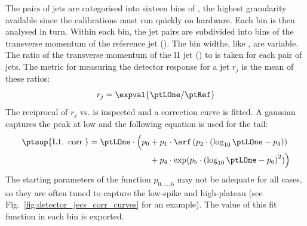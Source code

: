 The pairs of \glspl{jet} are categorised into sixteen bins of \abseta, the highest granularity available since the calibrations must run quickly on hardware. Each bin is then analysed in turn. Within each \abseta bin, the \gls{jet} pairs are subdivided into bins of the transverse momentum of the reference \gls{jet} (\ptRef). The bin widths, like \abseta, are variable. The ratio of the transverse momentum of the \acrshort{l1} \gls{jet} (\ptLOne) to \ptRef is taken for each pair of \glspl{jet}. The metric for measuring the detector response for a jet $r_j$ is the mean of these ratios:
\begin{equation}
    r_j = \expval{\ptLOne / \ptRef}
    \label{eq:jec_detector_response}
\end{equation}
The reciprocal of $r_j$ vs. \ptLOne is inspected and a correction curve is fitted. A gaussian captures the peak at low \pt and the following equation is used for the tail:
\begin{equation} %
    \begin{aligned}
\ptsup{{\mathrm{L1, \ corr.}}} = \ptLOne \cdot \Big( p_0 &+ p_1 \cdot \erf \left(p_2 \cdot \left( \log_{10}\ptLOne - p_3 \right) \right) \\
&+ p_4 \cdot \exp(p_5 \cdot \left( \log_{10}\ptLOne - p_6 \right)^2 ) \Big)
    \end{aligned}
    \label{eq:corr_curve_jec_tail}
\end{equation}
The starting parameters of the function $p_{0,\ldots,6}$ may not be adequate for all cases, so they are often tuned to capture the low-\pt spike and high-\pt plateau (see Fig.~\ref{fig:detector_jecs_corr_curves} for an example). The value of this fit function in each \ptRef bin is exported.


